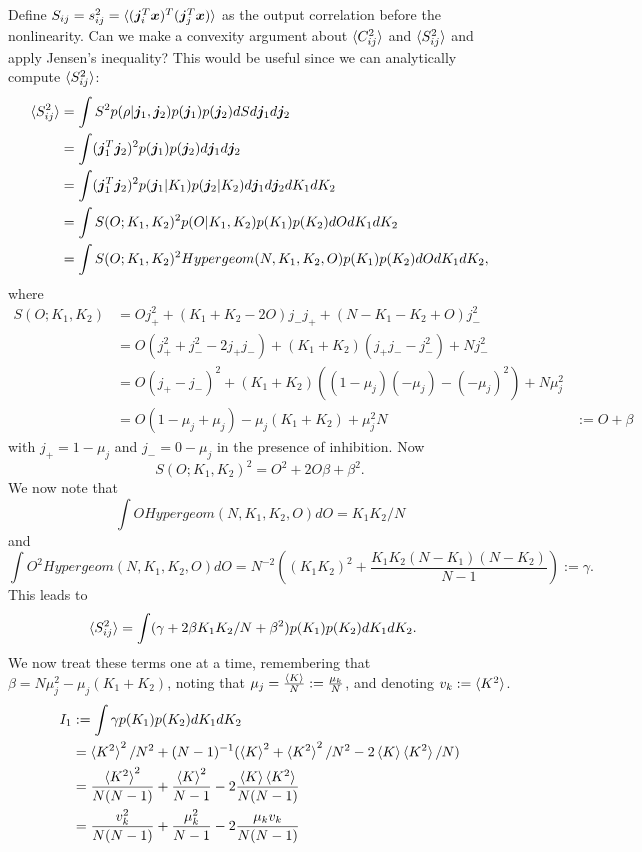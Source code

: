 \documentclass{article}
\renewcommand\b\bm
\begin{document}
Define $S_{ij} = s_{ij}^2 = \braket{(\b{j}_i^T \b{x})^T (\b{j}_j^T \b{x})}$ as the output correlation before the nonlinearity.
Can we make a convexity argument about $\braket{C_{ij}^2}$ and $\braket{S_{ij}^2}$ and apply Jensen's inequality?
This would be useful since we can analytically compute $\braket{S_{ij}^2}$:
\begin{align}
    \braket{S_{ij}^2} &= \int S^2 p(\rho|\b{j}_1, \b{j}_2) p(\b{j}_1) p(\b{j}_2) dS d\b{j}_1 d\b{j}_2\\
    &= \int (\b{j}_1^T \b{j}_2)^2 p(\b{j}_1) p(\b{j}_2) d\b{j}_1 d\b{j}_2\\
    &= \int (\b{j}_1^T \b{j}_2)^2 p(\b{j}_1|K_1) p(\b{j}_2|K_2) d\b{j}_1 d\b{j}_2 dK_1 dK_2\\
    &= \int S(O; K_1, K_2)^2 p(O|K_1, K_2) p(K_1) p(K_2) dO dK_1 dK_2\\
    &= \int S(O; K_1, K_2)^2 Hypergeom(N, K_1, K_2, O) p(K_1) p(K_2) dO dK_1 dK_2,
\end{align}
where 
\begin{align}
    S(O; K_1, K_2) &= O j_+^2 + (K_1 + K_2 - 2O) j_- j_+ + (N - K_1 - K_2 + O) j_-^2\\
    &= O(j_+^2 + j_-^2 - 2 j_+ j_-) + (K_1 + K_2)(j_+ j_- - j_-^2)+Nj_-^2\\
    &= O (j_+ - j_-)^2 + (K_1 + K_2)((1- \mu_j)(-\mu_j) - (-\mu_j)^2) + N \mu_j^2\\
    &= O(1 - \mu_j + \mu_j) - \mu_j (K_1 + K_2) + \mu_j^2 N
    &:= O + \beta
\end{align}
with $j_+ = 1 - \mu_j$ and $j_- = 0 - \mu_j$ in the presence of inhibition.
Now
\begin{equation}
    S(O; K_1, K_2)^2 = O^2 + 2O \beta + \beta^2.
\end{equation}
We now note that
\begin{equation}
    \int O Hypergeom(N, K_1, K_2, O) dO = K_1 K_2 / N
\end{equation}
and
\begin{equation}
    \int O^2 Hypergeom(N, K_1, K_2, O) dO = 
    N^{-2} \left ( (K_1 K_2)^2 + \frac{K_1 K_2 (N-K_1) (N-K_2)}{N-1} \right ) := \gamma.
\end{equation}
This leads to
\begin{align}
    \braket{S_{ij}^2}
    &= \int (\gamma + 2\beta K_1 K_2/N + \beta^2 ) p(K_1) p(K_2) dK_1 dK_2.
\end{align}
We now treat these terms one at a time, remembering that $\beta = N \mu_j^2 - \mu_j (K_1 + K_2)$, noting that $\mu_j = \frac{\braket{K}}{N} := \frac{\mu_k}{N}$, and denoting $v_k := \braket{K^2}$.
\begin{align}
    I_1 &:= \int \gamma p(K_1) p(K_2) dK_1 dK_2\\
    &= \braket{K^2}^2/N^2 + (N-1)^{-1} (\braket{K}^2 + \braket{K^2}^2/N^2 - 2 \braket{K} \braket{K^2} / N)\\
    &= \frac{\braket{K^2}^2}{N (N-1)} + \frac{\braket{K}^2}{N-1} - 2 \frac{\braket{K} \braket{K^2}}{N (N-1)}\\
    &= \frac{v_k^2}{N (N-1)} + \frac{\mu_k^2}{N-1} - 2 \frac{\mu_k v_k}{N (N-1)}
\end{align}
\end{document}
